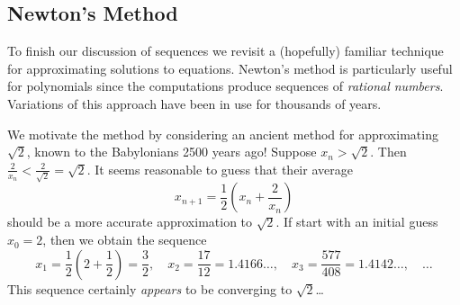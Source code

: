 \clearpage


\subsection{Newton's Method}

To finish our discussion of sequences we revisit a (hopefully) familiar technique for approximating solutions to equations. Newton's method is particularly useful for polynomials since the computations produce sequences of \emph{rational numbers}. Variations of this approach have been in use for thousands of years.


\begin{example}{}{}
	We motivate the method by considering an ancient method for approximating $\sqrt 2$, known to the Babylonians 2500 years ago!\smallbreak
	Suppose $x_n>\sqrt 2$. Then $\frac 2{x_n}<\frac 2{\sqrt 2}=\sqrt 2$. It seems reasonable to guess that their average
	\[
		x_{n+1}=\frac 12\left(x_n+\frac 2{x_n}\right)
	\]
	should be a more accurate approximation to $\sqrt 2$. If start with an initial guess $x_0=2$, then we obtain the sequence
	\[
		x_1=\frac 12\left(2+\frac 12\right)=\frac 32,\quad x_2=\frac{17}{12} =1.4166\ldots,\quad x_3=\frac{577}{408}=1.4142\ldots,\quad \ldots
	\]
	This sequence certainly \emph{appears} to be converging to $\sqrt 2$\ldots
\end{example}

